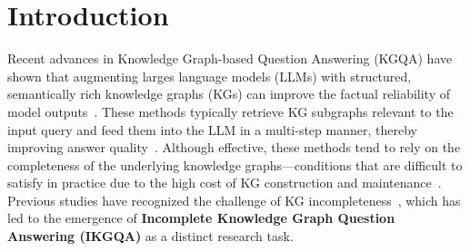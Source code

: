 \section{Introduction}




Recent advances in Knowledge Graph-based Question Answering (KGQA) have shown that augmenting larges language models (LLMs) with structured, semantically rich knowledge graphs (KGs) can improve the factual reliability of model outputs~\cite{luo2024reasoning, chen2024plan, tan2025paths, ma2025debate}. These methods typically retrieve KG subgraphs relevant to the input query and feed them into the LLM in a multi-step manner, thereby improving answer quality~\cite{sun2023think}. Although effective, these methods tend to rely on the completeness of the underlying knowledge graphs—conditions that are difficult to satisfy in practice due to the high cost of KG construction and maintenance~\cite{hur2021survey}. Previous studies have recognized the challenge of KG incompleteness~\cite{min2013distant, ren2020query2box, pflueger2022gnnq}, which has led to the emergence of \textbf{Incomplete Knowledge Graph Question Answering (IKGQA)} as a distinct research task. 


